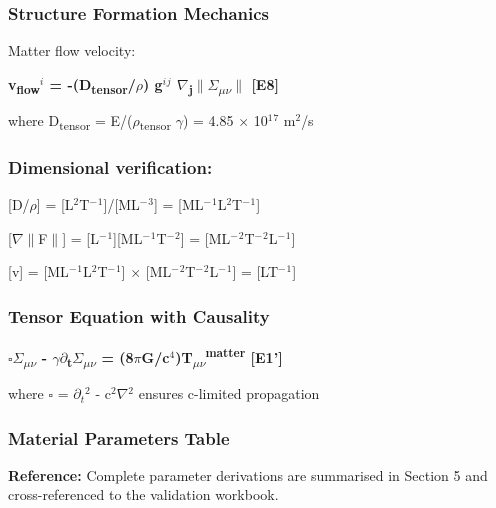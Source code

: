 \documentclass[11pt,a4paper]{article}
\begin{document}
\subsubsection{Structure Formation Mechanics}
Matter flow velocity:

\textbf{v\textsubscript{flow}$^{i}$ = -(D\textsubscript{tensor}/$\rho$) g$^{i}$$^{j}$ $\nabla$\textsubscript{j}$\|$$\Sigma$\textsubscript{$\mu$$\nu$}$\|$ [E8]}

where D\textsubscript{tensor} = E/\allowbreak{}($\rho$\textsubscript{tensor} $\gamma$) = 4.85 $\times$ 10$^{1}$$^{7}$ m$^{2}$/s

\begin{mdframed}[linecolor=accent,linewidth=0.5pt,backgroundcolor=callout-bg,leftline=true,rightline=true,topline=true,bottomline=true,innerleftmargin=8pt,innerrightmargin=8pt,innertopmargin=6pt,innerbottommargin=6pt]
\subsubsection{Dimensional verification:}
[D/\allowbreak{}$\rho$] = [L$^{2}$T$^{-}$$^{1}$]/[ML$^{-}$$^{3}$] = [ML$^{-}$$^{1}$L$^{2}$T$^{-}$$^{1}$]

[$\nabla$$\|$F$\|$] = [L$^{-}$$^{1}$][ML$^{-}$$^{1}$T$^{-}$$^{2}$] = [ML$^{-}$$^{2}$T$^{-}$$^{2}$L$^{-}$$^{1}$]

[v] = [ML$^{-}$$^{1}$L$^{2}$T$^{-}$$^{1}$] $\times$ [ML$^{-}$$^{2}$T$^{-}$$^{2}$L$^{-}$$^{1}$] = [LT$^{-}$$^{1}$] \checkmark{}
\end{mdframed}

\subsubsection{Tensor Equation with Causality}
\textbf{$\square$$\Sigma$\textsubscript{$\mu$$\nu$} - $\gamma$$\partial$\textsubscript{t}$\Sigma$\textsubscript{$\mu$$\nu$} = (8$\pi$G/\allowbreak{}c$^{4}$)T\textsubscript{$\mu$$\nu$}\textsuperscript{matter} [E1']}

where $\square$ = $\partial$$_{t}$$^{2}$ - c$^{2}$$\nabla$$^{2}$ ensures c-limited propagation

\begin{mdframed}[linecolor=accent,linewidth=0.5pt,backgroundcolor=callout-bg,leftline=true,rightline=true,topline=true,bottomline=true,innerleftmargin=8pt,innerrightmargin=8pt,innertopmargin=6pt,innerbottommargin=6pt]
\subsubsection{Material Parameters Table}
\textbf{Reference:} Complete parameter derivations are summarised in Section 5 and cross-referenced to the validation workbook.
\end{mdframed}
\end{document}
